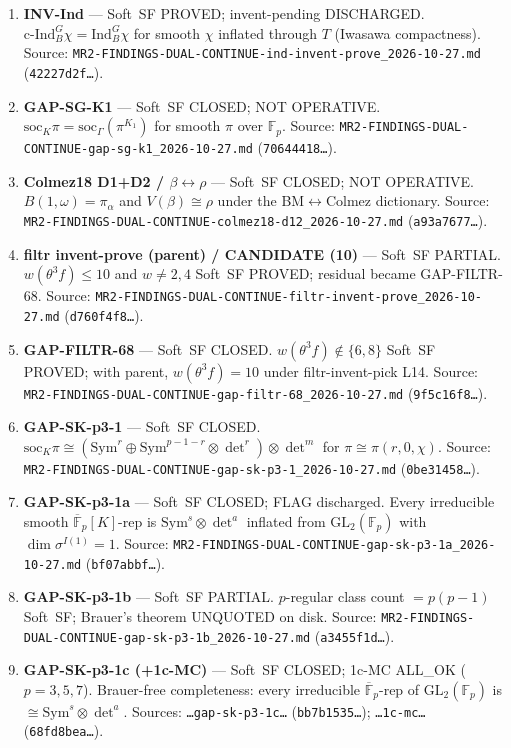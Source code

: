 \begin{enumerate}
\item \textbf{INV-Ind} --- Soft~SF PROVED; invent-pending DISCHARGED.
$\mathrm{c\text{-}Ind}_B^G\chi=\mathrm{Ind}_B^G\chi$ for smooth $\chi$ inflated through $T$ (Iwasawa compactness).
Source: \texttt{MR2-FINDINGS-DUAL-CONTINUE-ind-invent-prove\_2026-10-27.md} (\texttt{42227d2f\ldots}).

\item \textbf{GAP-SG-K1} --- Soft~SF CLOSED; NOT OPERATIVE.
$\mathrm{soc}_K\pi=\mathrm{soc}_\Gamma(\pi^{K_1})$ for smooth $\pi$ over $\mathbb{F}_p$.
Source: \texttt{MR2-FINDINGS-DUAL-CONTINUE-gap-sg-k1\_2026-10-27.md} (\texttt{70644418\ldots}).

\item \textbf{Colmez18 D1+D2 / $\beta\leftrightarrow\rho$} --- Soft~SF CLOSED; NOT OPERATIVE.
$B(1,\omega)=\pi_\alpha$ and $V(\beta)\cong\rho$ under the BM$\leftrightarrow$Colmez dictionary.
Source: \texttt{MR2-FINDINGS-DUAL-CONTINUE-colmez18-d12\_2026-10-27.md} (\texttt{a93a7677\ldots}).

\item \textbf{filtr invent-prove (parent) / CANDIDATE (10)} --- Soft~SF PARTIAL.
$w(\theta^3 f)\le 10$ and $w\neq 2,4$ Soft~SF PROVED; residual became GAP-FILTR-68.
Source: \texttt{MR2-FINDINGS-DUAL-CONTINUE-filtr-invent-prove\_2026-10-27.md} (\texttt{d760f4f8\ldots}).

\item \textbf{GAP-FILTR-68} --- Soft~SF CLOSED.
$w(\theta^3 f)\notin\{6,8\}$ Soft~SF PROVED; with parent, $w(\theta^3 f)=10$ under filtr-invent-pick L14.
Source: \texttt{MR2-FINDINGS-DUAL-CONTINUE-gap-filtr-68\_2026-10-27.md} (\texttt{9f5c16f8\ldots}).

\item \textbf{GAP-SK-p3-1} --- Soft~SF CLOSED.
$\mathrm{soc}_K\pi\cong(\mathrm{Sym}^r\oplus\mathrm{Sym}^{p-1-r}\otimes\det^r)\otimes\det^m$ for $\pi\cong\pi(r,0,\chi)$.
Source: \texttt{MR2-FINDINGS-DUAL-CONTINUE-gap-sk-p3-1\_2026-10-27.md} (\texttt{0be31458\ldots}).

\item \textbf{GAP-SK-p3-1a} --- Soft~SF CLOSED; FLAG discharged.
Every irreducible smooth $\overline{\mathbb{F}}_p[K]$-rep is $\mathrm{Sym}^s\otimes\det^a$ inflated from $\mathrm{GL}_2(\mathbb{F}_p)$ with $\dim\sigma^{I(1)}=1$.
Source: \texttt{MR2-FINDINGS-DUAL-CONTINUE-gap-sk-p3-1a\_2026-10-27.md} (\texttt{bf07abbf\ldots}).

\item \textbf{GAP-SK-p3-1b} --- Soft~SF PARTIAL.
$p$-regular class count $=p(p-1)$ Soft~SF; Brauer's theorem UNQUOTED on disk.
Source: \texttt{MR2-FINDINGS-DUAL-CONTINUE-gap-sk-p3-1b\_2026-10-27.md} (\texttt{a3455f1d\ldots}).

\item \textbf{GAP-SK-p3-1c (+1c-MC)} --- Soft~SF CLOSED; 1c-MC ALL\_OK ($p=3,5,7$).
Brauer-free completeness: every irreducible $\overline{\mathbb{F}}_p$-rep of $\mathrm{GL}_2(\mathbb{F}_p)$ is $\cong\mathrm{Sym}^s\otimes\det^a$.
Sources: \texttt{\ldots gap-sk-p3-1c\ldots} (\texttt{bb7b1535\ldots}); \texttt{\ldots 1c-mc\ldots} (\texttt{68fd8bea\ldots}).
\end{enumerate}


